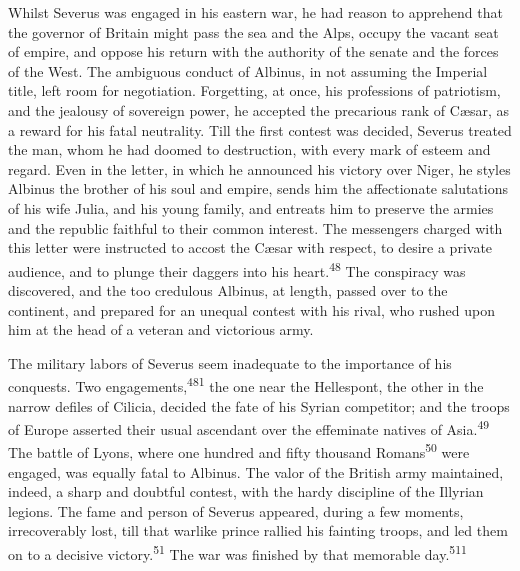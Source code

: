 



Whilst Severus was engaged in his eastern war, he had reason to
apprehend that the governor of Britain might pass the sea and the
Alps, occupy the vacant seat of empire, and oppose his return
with the authority of the senate and the forces of the West. The
ambiguous conduct of Albinus, in not assuming the Imperial title,
left room for negotiation. Forgetting, at once, his professions
of patriotism, and the jealousy of sovereign power, he accepted
the precarious rank of Cæsar, as a reward for his fatal
neutrality. Till the first contest was decided, Severus treated
the man, whom he had doomed to destruction, with every mark of
esteem and regard. Even in the letter, in which he announced his
victory over Niger, he styles Albinus the brother of his soul and
empire, sends him the affectionate salutations of his wife Julia,
and his young family, and entreats him to preserve the armies and
the republic faithful to their common interest. The messengers
charged with this letter were instructed to accost the Cæsar with
respect, to desire a private audience, and to plunge their
daggers into his heart.\textsuperscript{48} The conspiracy was discovered, and the
too credulous Albinus, at length, passed over to the continent,
and prepared for an unequal contest with his rival, who rushed
upon him at the head of a veteran and victorious army.


The military labors of Severus seem inadequate to the importance
of his conquests. Two engagements,\textsuperscript{481} the one near the
Hellespont, the other in the narrow defiles of Cilicia, decided
the fate of his Syrian competitor; and the troops of Europe
asserted their usual ascendant over the effeminate natives of
Asia.\textsuperscript{49} The battle of Lyons, where one hundred and fifty
thousand Romans\textsuperscript{50} were engaged, was equally fatal to Albinus.
The valor of the British army maintained, indeed, a sharp and
doubtful contest, with the hardy discipline of the Illyrian
legions. The fame and person of Severus appeared, during a few
moments, irrecoverably lost, till that warlike prince rallied his
fainting troops, and led them on to a decisive victory.\textsuperscript{51} The
war was finished by that memorable day.\textsuperscript{511}

